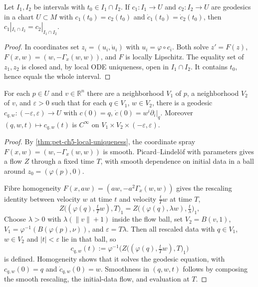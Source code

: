 \begin{theorem}
  \label{thm:pet-ch5-local-uniqueness}
  \leanok
  Let $I_1,I_2$ be intervals with $t_0\in I_1\cap I_2$. If $c_1:I_1\to U$ and
  $c_2:I_2\to U$ are geodesics in a chart $U\subset M$ with $c_1(t_0)=c_2(t_0)$ and
  $\dot c_1(t_0)=\dot c_2(t_0)$, then $c_1|_{I_1\cap I_2}=c_2|_{I_1\cap I_2}$.
\end{theorem}
\begin{proof}
  \leanok
  \sketch
  In coordinates set $z_i=(u_i,\dot u_i)$ with $u_i=\varphi\circ c_i$. Both solve
  $z'=F(z)$, $F(x,w)=(w,-\Gamma_x(w,w))$, and $F$ is locally Lipschitz. The
  equality set of $z_1,z_2$ is closed and, by local ODE uniqueness, open in
  $I_1\cap I_2$. It contains $t_0$, hence equals the whole interval.
\end{proof}

\begin{theorem}
  \label{thm:pet-ch5-local-existence}
  \leanok
  For each $p\in U$ and $v\in\mathbb R^n$ there are a neighborhood $V_1$ of $p$, a
  neighborhood $V_2$ of $v$, and $\varepsilon>0$ such that for each $q\in V_1$,
  $w\in V_2$, there is a geodesic $c_{q,w}:(-\varepsilon,\varepsilon)\to U$ with $c(0)=q$,
  $\dot c(0)=w^i\partial_i|_q$. Moreover $(q,w,t)\mapsto c_{q,w}(t)$ is $C^\infty$ on
  $V_1\times V_2\times(-\varepsilon,\varepsilon)$.
\end{theorem}
\begin{proof}
  \leanok
  \sketch
  By \cref{thm:pet-ch5-local-uniqueness}, the coordinate spray
  $F(x,w)=(w,-\Gamma_x(w,w))$ is smooth. Picard--Lindel\"of with parameters
  gives a flow $Z$ through a fixed time $T$, with smooth dependence on initial
  data in a ball around $z_0=(\varphi(p),0)$.

  Fibre homogeneity $F(x,aw)=(aw,-a^2\Gamma_x(w,w))$ gives the rescaling
  identity between velocity $w$ at time $t$ and velocity $\tfrac tT w$ at time $T$,
  \[
    Z\big((\varphi(q),\tfrac tT w),T\big)_1
      = Z\big((\varphi(q),\lambda w),\tfrac t\lambda\big)_1 ,
  \]
  Choose $\lambda>0$ with $\lambda(\lVert v\rVert+1)$ inside the flow ball,
  set $V_2=B(v,1)$, $V_1=\varphi^{-1}(B(\varphi(p),\nu))$, and
  $\varepsilon=T\lambda$. Then all rescaled data with $q\in V_1$, $w\in V_2$
  and $|t|<\varepsilon$ lie in that ball, so
  \[
    c_{q,w}(t) := \varphi^{-1}\Big(Z\big((\varphi(q),\tfrac tT w),T\big)_1\Big)
  \]
  is defined. Homogeneity shows that it solves the geodesic equation, with
  $c_{q,w}(0)=q$ and $\dot c_{q,w}(0)=w$. Smoothness in $(q,w,t)$ follows by
  composing the smooth rescaling, the initial-data flow, and evaluation at $T$.
\end{proof}

